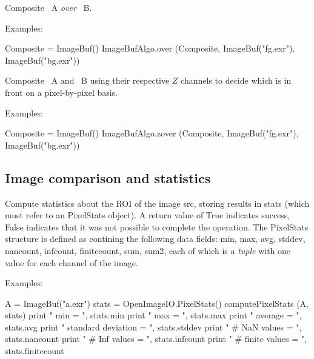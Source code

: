 

Composite \ImageBuf\ {\cf A} \emph{over} \ImageBuf\ {\cf B}.

\smallskip
\noindent Examples:
\begin{code}
    Composite = ImageBuf()
    ImageBufAlgo.over (Composite, ImageBuf("fg.exr"), ImageBuf("bg.exr"))
\end{code}
\apiend


 

Composite \ImageBuf\ {\cf A} and \ImageBuf\ {\cf B} using their respective
$Z$ channels to decide which is in front on a pixel-by-pixel basis.

\smallskip
\noindent Examples:
\begin{code}
    Composite = ImageBuf()
    ImageBufAlgo.zover (Composite, ImageBuf("fg.exr"), ImageBuf("bg.exr"))
\end{code}
\apiend



\subsection{Image comparison and statistics}
\label{sec:iba:py:stats}


 

Compute statistics about the ROI of the image {\cf src}, storing results
in {\cf stats} (which must refer to an {\cf PixelStats} object).  A return
value of {\cf True} indicates success, {\cf False} indicates that it was
not possible to complete the operation.
The {\cf PixelStats} structure is defined as contining the following
data fields: {\cf min}, {\cf max}, {\cf avg}, {\cf stddev},
{\cf nancount}, {\cf infcount}, {\cf finitecount}, {\cf sum}, {\cf sum2},
each of which is a \emph{tuple} with one value for each channel of the image.

\smallskip
\noindent Examples:
\begin{code}
    A = ImageBuf("a.exr")
    stats = OpenImageIO.PixelStats()
    computePixelStats (A, stats)
    print "   min = ", stats.min
    print "   max = ", stats.max
    print "   average = ", stats.avg
    print "   standard deviation  = ", stats.stddev
    print "   # NaN values    = ", stats.nancount
    print "   # Inf values    = ", stats.infcount
    print "   # finite values = ", stats.finitecount
\end{code}
\apiend


